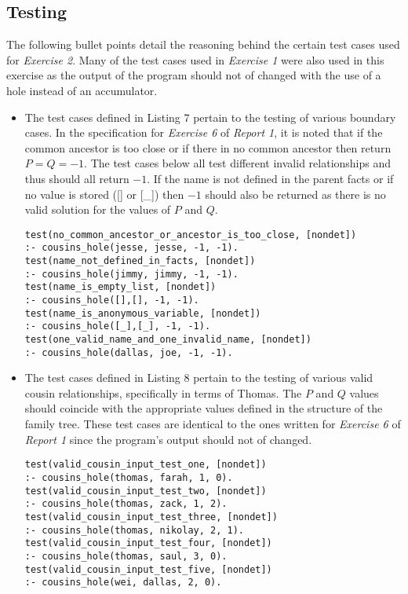 \documentclass[11pt]{article}
\newcommand{\forceindent}{\leavevmode{\parindent=1em\indent}}
\begin{document}
	\subsection{Testing}
\forceindent The following bullet points detail the reasoning behind the certain test cases used for \emph{Exercise 2}. Many of the test cases used in \emph{Exercise 1} were also used in this exercise as the output of the program should not of changed with the use of a hole instead of an accumulator. 
\begin{itemize}
\item 
The test cases defined in Listing 7 pertain to the testing of various boundary cases. In the specification for \emph{Exercise 6} of \emph{Report 1}, it is noted that if the common ancestor is too close or if there in no common ancestor then return $P=Q=-1$. The test cases below all test different invalid relationships and thus should all return $-1$. If the name is not defined in the parent facts or if no value is stored ([] or [\_]) then $-1$ should also be returned as there is no valid solution for the values of $P$ and $Q$. 
\begin{lstlisting}[caption= Boundary Cases, label= Listing 7]
test(no_common_ancestor_or_ancestor_is_too_close, [nondet]) 
:- cousins_hole(jesse, jesse, -1, -1).
test(name_not_defined_in_facts, [nondet]) 
:- cousins_hole(jimmy, jimmy, -1, -1).
test(name_is_empty_list, [nondet]) 
:- cousins_hole([],[], -1, -1).
test(name_is_anonymous_variable, [nondet]) 
:- cousins_hole([_],[_], -1, -1).
test(one_valid_name_and_one_invalid_name, [nondet]) 
:- cousins_hole(dallas, joe, -1, -1).	
\end{lstlisting}


\item 
The test cases defined in Listing 8 pertain to the testing of various valid cousin relationships, specifically in terms of Thomas. The $P$ and $Q$ values should coincide with
the appropriate values defined in the structure of the family tree. These test cases are identical to the ones written for \emph{Exercise 6} of \emph{Report 1} since the program's output should not of changed.
\begin{lstlisting}[caption= Valid Relationships, label= Listing 8]
test(valid_cousin_input_test_one, [nondet]) 
:- cousins_hole(thomas, farah, 1, 0).
test(valid_cousin_input_test_two, [nondet]) 
:- cousins_hole(thomas, zack, 1, 2).
test(valid_cousin_input_test_three, [nondet]) 
:- cousins_hole(thomas, nikolay, 2, 1).
test(valid_cousin_input_test_four, [nondet]) 
:- cousins_hole(thomas, saul, 3, 0).
test(valid_cousin_input_test_five, [nondet]) 
:- cousins_hole(wei, dallas, 2, 0).
\end{lstlisting}


\end{itemize}
\end{document}
